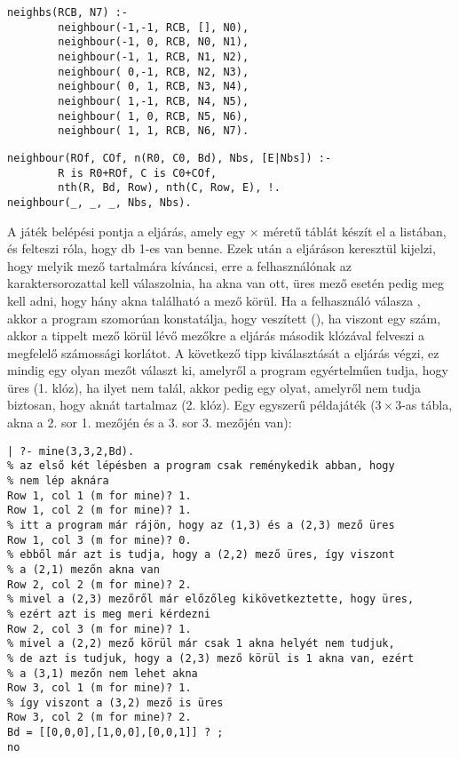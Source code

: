 \begin{verbatim}
neighbs(RCB, N7) :-
        neighbour(-1,-1, RCB, [], N0), 
        neighbour(-1, 0, RCB, N0, N1),
        neighbour(-1, 1, RCB, N1, N2), 
        neighbour( 0,-1, RCB, N2, N3),
        neighbour( 0, 1, RCB, N3, N4), 
        neighbour( 1,-1, RCB, N4, N5),
        neighbour( 1, 0, RCB, N5, N6), 
        neighbour( 1, 1, RCB, N6, N7).
\end{verbatim}
\begin{verbatim}
neighbour(ROf, COf, n(R0, C0, Bd), Nbs, [E|Nbs]) :-
        R is R0+ROf, C is C0+COf, 
        nth(R, Bd, Row), nth(C, Row, E), !.
neighbour(_, _, _, Nbs, Nbs).
\end{verbatim}

A játék belépési pontja a  eljárás, amely
egy  $\times$  méretű táblát készít el a 
listában, és felteszi róla, hogy  db 1-es van benne.
Ezek után a  eljáráson keresztül kijelzi, hogy melyik
mező tartalmára kíváncsi, erre a felhasználónak az  karaktersorozattal
kell válaszolnia, ha akna van ott, üres mező esetén pedig meg kell adni, hogy
hány akna található a mező körül. Ha a felhasználó válasza , akkor a
program szomorúan konstatálja, hogy veszített (), ha viszont egy
szám, akkor a tippelt mező körül lévő mezőkre a  eljárás
második klózával felveszi a megfelelő számossági korlátot. A következő tipp
kiválasztását a  eljárás végzi, ez mindig egy olyan mezőt
választ ki, amelyről a program egyértelműen tudja, hogy üres (1. klóz), ha ilyet
nem talál, akkor pedig egy olyat, amelyről nem tudja biztosan, hogy aknát tartalmaz
(2. klóz). Egy egyszerű példajáték ($3 \times 3$-as tábla, akna a 2. sor 1. mezőjén
és a 3. sor 3. mezőjén van):

\begin{verbatim}
| ?- mine(3,3,2,Bd).
% az első két lépésben a program csak reménykedik abban, hogy
% nem lép aknára
Row 1, col 1 (m for mine)? 1.
Row 1, col 2 (m for mine)? 1.
% itt a program már rájön, hogy az (1,3) és a (2,3) mező üres
Row 1, col 3 (m for mine)? 0.
% ebből már azt is tudja, hogy a (2,2) mező üres, így viszont
% a (2,1) mezőn akna van
Row 2, col 2 (m for mine)? 2.
% mivel a (2,3) mezőről már előzőleg kikövetkeztette, hogy üres,
% ezért azt is meg meri kérdezni
Row 2, col 3 (m for mine)? 1.
% mivel a (2,2) mező körül már csak 1 akna helyét nem tudjuk,
% de azt is tudjuk, hogy a (2,3) mező körül is 1 akna van, ezért
% a (3,1) mezőn nem lehet akna
Row 3, col 1 (m for mine)? 1.
% így viszont a (3,2) mező is üres
Row 3, col 2 (m for mine)? 2.
Bd = [[0,0,0],[1,0,0],[0,0,1]] ? ;
no
\end{verbatim}

